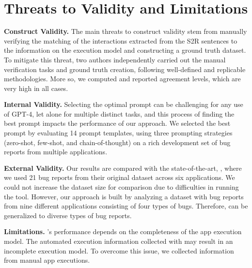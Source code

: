 
\section{Threats to Validity and Limitations}
\label{sec:threats}
\textbf{Construct Validity.}
The main threats to construct validity stem from manually verifying the matching of the interactions extracted from the S2R sentences to the information on the execution model and constructing a ground truth dataset. 
To mitigate this threat, two authors independently carried out the manual verification tasks and ground truth creation, following well-defined and replicable methodologies.
More so, we computed and reported agreement levels, which are very high in all cases. 

\textbf{Internal Validity.}
Selecting the optimal prompt can be challenging for any use of GPT-4, let alone for multiple distinct tasks, and this process of finding the best prompt impacts the performance of our approach.
We selected the best prompt by evaluating 14 prompt templates, using three prompting strategies (\ie zero-shot, few-shot, and chain-of-thought) on a rich development set of bug reports from multiple applications.

\textbf{External Validity.}
Our results are compared with the state-of-the-art, \EulerC, where we used 21 bug reports from their original dataset across six applications. We could not increase the dataset size for comparison due to difficulties in running the \EulerC tool. However, our approach is built by analyzing a dataset with bug reports from nine different applications consisting of four types of bugs. Therefore, \tool can be generalized to diverse types of bug reports.

\textbf{Limitations.}
\tool's performance depends on the completeness of the app execution model.
The automated execution information collected with \CrashScope may result in an incomplete execution model.
To overcome this issue, we collected information from manual app executions. 